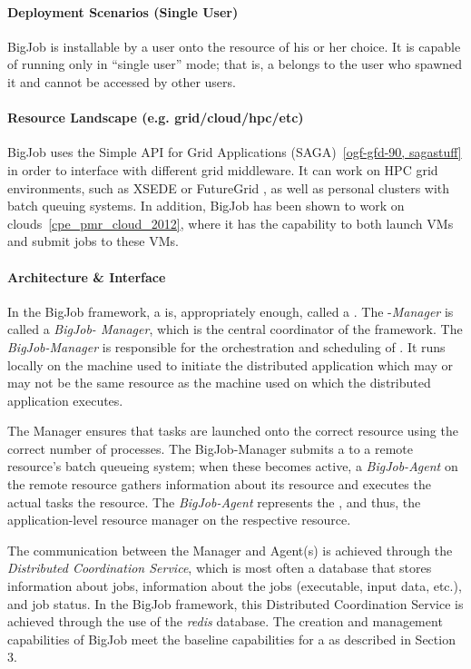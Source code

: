 \documentclass{sig-alternate}
\begin{document}
\paragraph{Deployment Scenarios (Single User)}
BigJob is installable by a user onto the resource of his or her choice. It is capable of
running only in ``single user'' mode; that is, a \pilot belongs to the user who
spawned it and cannot be accessed by other users.

\paragraph{Resource Landscape (e.g. grid/cloud/hpc/etc)}
BigJob uses the Simple API for Grid Applications (SAGA)~\ref{ogf-gfd-90, sagastuff}
in order to interface with different grid middleware. It can work on HPC grid
environments, such as XSEDE or FutureGrid , as well as personal
clusters with batch queuing systems. In addition, BigJob has been shown to work
on clouds~\ref{cpe_pmr_cloud_2012}, where it has the capability to both
launch VMs and submit jobs to these VMs.

\paragraph{Architecture \& Interface}

In the BigJob framework, a \pilot is, appropriately enough, called a
\pilot. The \pilot-\textit{Manager} is called a \textit{BigJob-
Manager}, which is the central coordinator of the
framework. The \textit{BigJob-Manager} is responsible for
the orchestration and scheduling of \pilots. It runs locally on the
machine used to initiate the distributed application which may or may
not be the same resource as the machine used on which the distributed
application executes.

The Manager ensures that tasks are launched onto the correct resource
using the correct number of processes. The BigJob-Manager submits a
\pilot to a remote resource's batch queueing system; when these
\pilots becomes active, a \textit{BigJob-Agent} on the remote resource 
gathers information about its resource
and executes the actual tasks the resource. The \textit{BigJob-Agent}
represents the \pilotjob, and thus, the application-level resource
manager on the respective resource.
 
The communication between the Manager and Agent(s) is achieved through
the {\it Distributed Coordination Service}, which is most often a
database that stores information about jobs, information about the
jobs (executable, input data, etc.), and job status. In the BigJob framework,
this Distributed Coordination Service is achieved through the use
of the \textit{redis} database. 
The \pilot creation and management capabilities of BigJob meet 
the baseline capabilities for a \pilotjob as described in Section 3.
\end{document}
